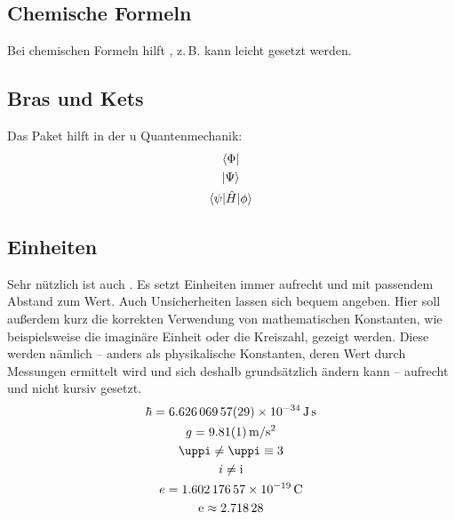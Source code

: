 \subsection{Chemische Formeln}
Bei chemischen Formeln hilft , z.\,B. kann leicht  gesetzt werden.
\subsection{Bras und Kets}
Das Paket  hilft in der u
Quantenmechanik:
\begin{gather}
 \bra{\Phi}\\
 \ket{\Psi}\\
 \braket{\psi|\hat{H}|\phi}
\end{gather}
\subsection{Einheiten}
Sehr nützlich ist auch . Es setzt Einheiten immer aufrecht und mit passendem Abstand zum Wert. Auch Unsicherheiten lassen sich bequem angeben. Hier soll außerdem kurz die korrekten Verwendung von mathematischen Konstanten, wie beispielsweise die imaginäre Einheit oder die Kreiszahl, gezeigt werden. Diese werden nämlich -- anders als physikalische Konstanten, deren Wert durch Messungen ermittelt wird und sich deshalb grundsätzlich ändern kann -- aufrecht und nicht kursiv gesetzt.
\begin{gather}
 \hbar = \SI[separate-uncertainty=false]{6.62606957(29)e-34}{\joule\second}\\
 g = \SI{9.81(1)}{\meter \per \s^2}\\
 \pi \neq  \uppi \equiv 3\\
 i \neq \i\\
 e = \SI{1.60217657e-19}{\coulomb}\\
 \e \approx \num{2.71828}\\
\end{gather}
